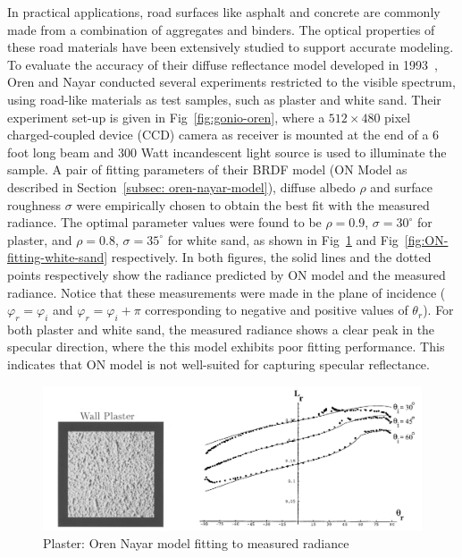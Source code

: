 In practical applications, road surfaces like asphalt and concrete are commonly made from a combination of aggregates and binders.
The optical properties of these road materials have been extensively studied to support accurate modeling.
To evaluate the accuracy of their diffuse reflectance model developed in 1993~\cite{1995_Oren}, Oren and Nayar conducted several experiments restricted to the visible spectrum, using road-like materials as test samples, such as plaster and white sand.
Their experiment set-up is given in Fig~\ref{fig:gonio-oren}, where a $512\times 480 $ pixel charged-coupled device (CCD) camera as receiver is mounted at the end of a 6 foot long beam and $300 $ Watt incandescent light source is used to illuminate the sample.
A pair of fitting parameters of their BRDF model (ON Model as described in Section~\eqref{subsec: oren-nayar-model}), diffuse albedo $\rho$ and surface roughness $\sigma$ were empirically chosen to obtain the best fit with the measured radiance.
The optimal parameter values were found to be $\rho = 0.9$, $\sigma = 30^\circ$ for plaster, and $\rho = 0.8$, $\sigma = 35^\circ$ for white sand, as shown in Fig~\ref{fig:ON-fitting-plaster} and Fig~\ref{fig:ON-fitting-white-sand} respectively.
In both figures, the solid lines and the dotted points respectively show the radiance predicted by ON model and the measured radiance.
Notice that these measurements were made in the plane of incidence ($\varphi_r =\varphi_i$ and $\varphi_r =\varphi_i +\pi$ corresponding to negative and positive values of $\theta_r$).
For both plaster and white sand, the measured radiance shows a clear peak in the specular direction, where the this model exhibits poor fitting performance.
This indicates that ON model is not well-suited for capturing specular reflectance.

\begin{figure}[!tb]
    \centering
    \includegraphics[width=0.9\linewidth]{./figures/measurement-literature/ON-fitting-plaster-full.png}
    \caption{Plaster: Oren Nayar model fitting to measured radiance}
    \label{fig:ON-fitting-plaster}
\end{figure}

